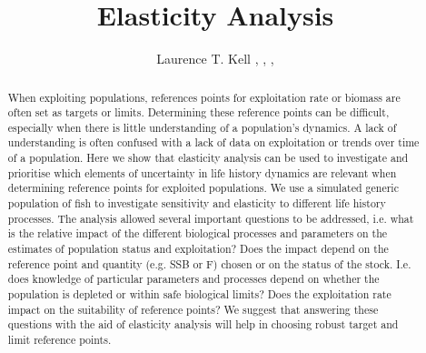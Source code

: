 \documentclass{pnastwo}
\begin{document}
\title{Elasticity Analysis}

\author{Laurence T. Kell ,
             ,
             ,
\and         {}}


\maketitle

\begin{article}
\begin{abstract}
When exploiting populations, references points for exploitation rate or biomass are often set as targets or limits. Determining these reference points can be difficult, especially when there is little understanding of a population’s dynamics. A lack of understanding 
is often confused with a lack of data on exploitation or trends over time of a population. Here we show that elasticity analysis can 
be used to investigate and prioritise which elements of uncertainty in life history dynamics are relevant when determining reference 
points for exploited populations. We use a simulated generic population of fish to investigate sensitivity and elasticity to different 
life history processes. The analysis allowed several important questions to be addressed, i.e. what is the relative impact of the 
diﬀerent biological processes and parameters on the estimates of population status and exploitation? Does the impact depend on the 
reference point and quantity (e.g. SSB or F) chosen or on the status of the stock. I.e. does knowledge of particular parameters and 
processes depend on whether the population is depleted or within safe biological limits? Does the exploitation rate impact on the 
suitability of reference points? We suggest that answering these questions with the aid of elasticity analysis will help in choosing 
robust target and limit reference points. 
\end{abstract}




\end{article}
\end{document}
